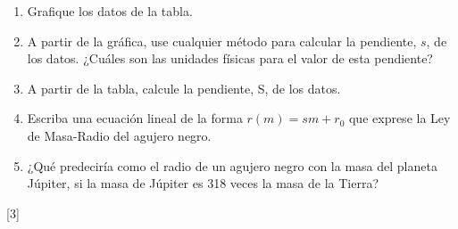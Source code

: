 \documentclass[a4paper]{article}
\newcounter{problema}
\begin{document}
\begin{problema}
\begin{enumerate}
	\item Grafique los datos de la tabla.
	\item A partir de la gráfica, use cualquier método para calcular la pendiente, $s$, de los datos. ¿Cuáles son las unidades físicas para el valor de esta pendiente?
	\item A partir de la tabla, calcule la pendiente, S, de los datos.
	\item Escriba una ecuación lineal de la forma $r(m) = s m + r_0$ que exprese la Ley de Masa-Radio del agujero negro.
	\item ¿Qué predeciría como el radio de un agujero negro con la masa del planeta Júpiter, si la masa de Júpiter es 318 veces la masa de la Tierra?
\end{enumerate}

\end{problema}
[3] \cite{NASA_BlackHoleMath}



\end{document}
